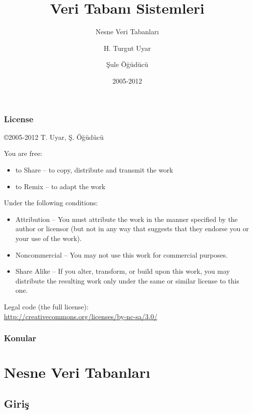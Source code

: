 \documentclass[dvipsnames]{beamer}
\title{Veri Tabanı Sistemleri}
\subtitle{Nesne Veri Tabanları}
\author{H. Turgut Uyar \and Şule Öğüdücü}
\date{2005-2012}
\theoremstyle{definition}
\theoremstyle{example}
\theoremstyle{plain}
\begin{document}
\begin{frame}
  \titlepage
\end{frame}

\begin{frame}
  \frametitle{License}

  \hfill
  \copyright 2005-2012 T. Uyar, Ş. Öğüdücü

  \vfill
  \begin{tiny}
    You are free:
    \begin{itemize}
      \item to Share -- to copy, distribute and transmit the work
      \item to Remix -- to adapt the work
    \end{itemize}

    Under the following conditions:
    \begin{itemize}
      \item Attribution -- You must attribute the work in the manner specified by
        the author or licensor (but not in any way that suggests that they
        endorse you or your use of the work).

      \item Noncommercial -- You may not use this work for commercial purposes.

      \item Share Alike -- If you alter, transform, or build upon this work, you
        may distribute the resulting work only under the same or similar license
        to this one.
    \end{itemize}
  \end{tiny}

  \vfill
  Legal code (the full license):\\
  \url{http://creativecommons.org/licenses/by-nc-sa/3.0/}
\end{frame}

\begin{frame}
  \frametitle{Konular}
  \tableofcontents
\end{frame}

\section{Nesne Veri Tabanları}

\subsection{Giriş}
\end{document}
